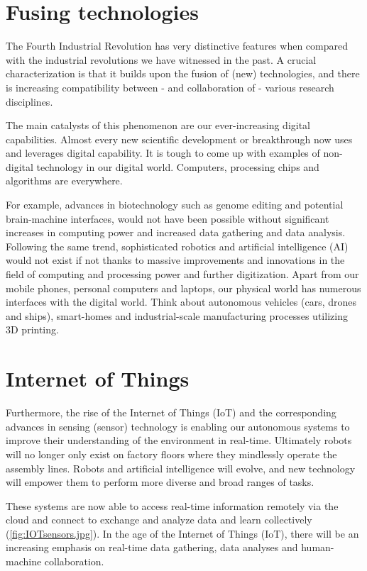     \section{Fusing technologies}
    
    The Fourth Industrial Revolution has very distinctive features when compared with the industrial revolutions we have witnessed in the past. A crucial characterization is that it builds upon the fusion of (new) technologies, and there is increasing compatibility between - and collaboration of - various research disciplines.
    
    The main catalysts of this phenomenon are our ever-increasing digital capabilities.
    Almost every new scientific development or breakthrough now uses and leverages digital capability. It is tough to come up with examples of non-digital technology in our digital world. Computers, processing chips and algorithms are everywhere.\medskip
    
    For example, advances in biotechnology such as genome editing and potential brain-machine interfaces, would not have been possible without significant increases in computing power and increased data gathering and data analysis. Following the same trend, sophisticated robotics and artificial intelligence (AI) would not exist if not thanks to massive improvements and innovations in the field of computing and processing power and further digitization. Apart from our mobile phones, personal computers and laptops, our physical world has numerous interfaces with the digital world. Think about autonomous vehicles (cars, drones and ships), smart-homes and industrial-scale manufacturing processes utilizing 3D printing.\medskip
  

    \section{Internet of Things}
    Furthermore, the rise of the Internet of Things (IoT) and the corresponding advances in sensing (sensor) technology is enabling our autonomous systems to improve their understanding of the environment in real-time. Ultimately robots will no longer only exist on factory floors where they mindlessly operate the assembly lines. Robots and artificial intelligence will evolve, and new technology will empower them to perform more diverse and broad ranges of tasks.    
  
    These systems are now able to access real-time information remotely via the cloud and connect to exchange and analyze data and learn collectively (\cref{fig:IOTsensors.jpg}). In the age of the Internet of Things (IoT), there will be an increasing emphasis on real-time data gathering, data analyses and human-machine collaboration.
    \medskip
    

